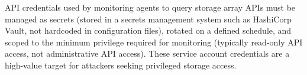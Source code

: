 API credentials used by monitoring agents to query storage array APIs must be managed as secrets (stored in a secrets management system such as HashiCorp Vault, not hardcoded in configuration files), rotated on a defined schedule, and scoped to the minimum privilege required for monitoring (typically read-only API access, not administrative API access). These service account credentials are a high-value target for attackers seeking privileged storage access.

